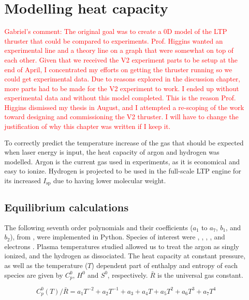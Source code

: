 \chapter{Modelling heat capacity} \label{chp:models}
    
    \textcolor{red}{Gabriel's comment: The original goal was to create a 0D model of the LTP thruster that could be compared to experiments. Prof. Higgins wanted an experimental line and a theory line on a graph that were somewhat on top of each other. Given that we received the V2 experiment parts to be setup at the end of April, I concentrated my efforts on getting the thruster running so we could get experimental data. Due to reasons explored in the discussion chapter, more parts had to be made for the V2 experiment to work. I ended up without experimental data and without this model completed. This is the reason Prof. Higgins dismissed my thesis in August, and I attempted a re-scoping of the work toward designing and commissioning the V2 thruster. I will have to change the justification of why this chapter was written if I keep it.}

    To correctly predict the temperature increase of the gas that should be expected when laser energy is input, the heat capacity of argon and hydrogen was modelled. Argon is the current gas used in experiments, as it is economical and easy to ionize. Hydrogen is projected to be used in the full-scale LTP engine for its increased $I_\mathrm{sp}$ due to having lower molecular weight.

    \section{Equilibrium calculations} \label{sec:equilibrium calcs}
        
        The following seventh order polynomials and their coefficients ($a_1$ to $a_7$, $b_1$, and $b_2$), from \textcite{mcbrideNASAGlennCoefficients2002}, were implemented in Python. Species of interest were , , , , and electrons . Plasma temperatures studied allowed us to treat the argon as singly ionized, and the hydrogen as dissociated. The heat capacity at constant pressure, as well as the temperature ($T$) dependent part of enthalpy and entropy of each species are given by $C_p^0$, $H^0$ and $S^0$, respectively. $\bar R$ is the universal gas constant.

        \begin{equation}
            C_p^0 (T)/\bar R = a_1 T^{-2} + a_2 T^{-1} + a_3 + a_4   T + a_5 T^2 + a_6 T^3 + a_7 T^4
        \end{equation} 
        
